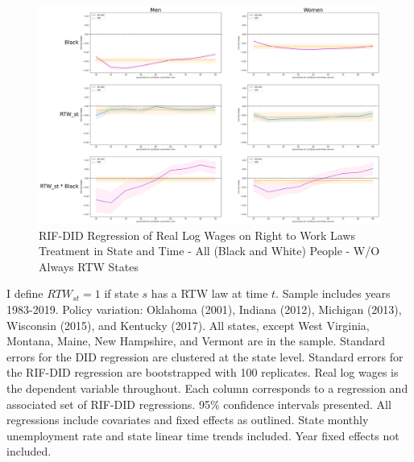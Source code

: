 \documentclass[11pt]{article}
\begin{document}
{\pagebreak
\begin{landscape}
\begin{figure}[ht!]
\centering
    \caption{RIF-DID Regression of Real Log Wages on Right to Work Laws Treatment in State and Time - All (Black and White) People - W/O Always RTW States}\label{fig:rifdid-sltt-wo-ar2w-A}
    \includegraphics[width=1.25\textwidth, height = \textheight, keepaspectratio]{figures/fin_rifdid-sltt-wo-ar2w-A.png}
\end{figure}
\footnotesize{I define $RTW_{st} = 1$ if state $s$ has a RTW law at time $t$. Sample includes years 1983-2019. Policy variation: Oklahoma (2001), Indiana (2012), Michigan (2013), Wisconsin (2015), and Kentucky (2017). All states, except West Virginia, Montana, Maine, New Hampshire, and Vermont are in the sample. Standard errors for the DID regression are clustered at the state level. Standard errors for the RIF-DID regression are bootstrapped with 100 replicates. Real log wages is the dependent variable throughout. Each column corresponds to a regression and associated set of RIF-DID regressions. 95\% confidence intervals presented. All regressions include covariates and fixed effects as outlined. State monthly unemployment rate and state linear time trends included. Year fixed effects not included.}
\end{landscape}

}
\end{document}
